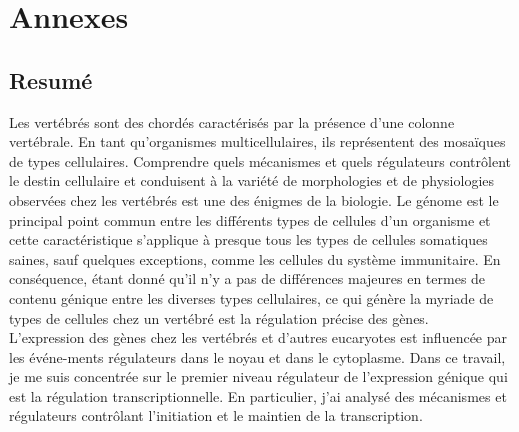 \chapter{Annexes}

	\section{Resum\'e}

		Les vert\'ebr\'es sont des chord\'es caract\'eris\'es par la pr\'esence d'une colonne vert\'ebrale. En tant qu'organismes multicellulaires, ils repr\'esentent des mosa\"iques de types cellulaires. Comprendre quels m\'ecanismes et quels r\'egulateurs contr\^olent le destin cellulaire et conduisent \`a la vari\'et\'e de morphologies et de physiologies observ\'ees chez les vert\'ebr\'es est une des \'enigmes de la biologie. Le g\'enome est le principal point commun entre les diff\'erents types de cellules d'un organisme et cette caract\'eristique s'applique \`a presque tous les types de cellules somatiques saines, sauf quelques exceptions, comme les cellules du syst\`eme immunitaire. En cons\'equence, \'etant donn\'e qu'il n'y a pas de diff\'erences majeures en termes de contenu g\'enique entre les diverses types cellulaires, ce qui g\'en\`ere la myriade de types de cellules chez un vert\'ebr\'e est la r\'egulation pr\'ecise des g\`enes.\\

		L'expression des g\`enes chez les vert\'ebr\'es et d'autres eucaryotes est influenc\'ee par les \'ev\'ene-ments r\'egulateurs dans le noyau et dans le cytoplasme. Dans ce travail, je me suis concentr\'ee sur le premier niveau r\'egulateur de l'expression g\'enique qui est la r\'egulation transcriptionnelle. En particulier, j'ai analys\'e des m\'ecanismes et r\'egulateurs contr\^olant l'initiation et le maintien de la transcription.\\

